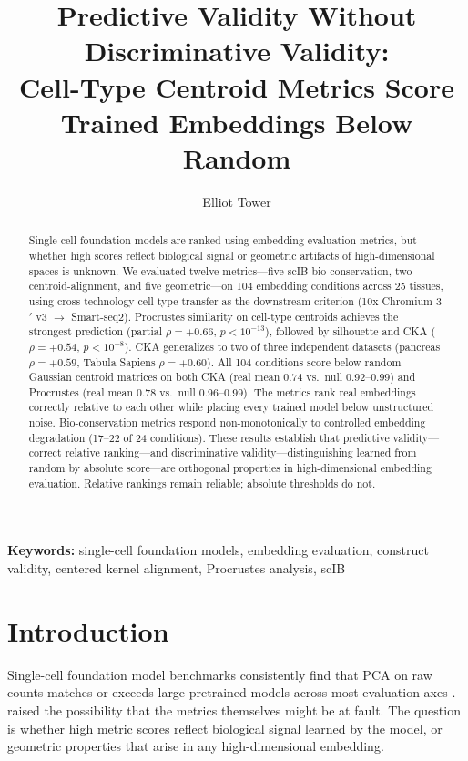 \documentclass[11pt]{article}
\title{Predictive Validity Without Discriminative Validity:\\
Cell-Type Centroid Metrics Score Trained Embeddings Below Random}
\author{Elliot Tower}
\affil{Independent Researcher \\ \texttt{elliot@elliottower.ai}}
\date{}
\begin{document}
\linenumbers
\maketitle

\begin{abstract}
Single-cell foundation models are ranked using embedding evaluation
metrics, but whether high scores reflect biological signal or geometric
artifacts of high-dimensional spaces is unknown. We evaluated twelve
metrics---five scIB bio-conservation, two centroid-alignment, and five
geometric---on 104 embedding conditions across 25 tissues, using
cross-technology cell-type transfer as the downstream criterion (10x
Chromium 3$'$ v3 $\rightarrow$ Smart-seq2). Procrustes similarity on
cell-type centroids achieves the strongest prediction (partial
$\rho = +0.66$, $p < 10^{-13}$), followed by silhouette and CKA
($\rho = +0.54$, $p < 10^{-8}$). CKA generalizes to two of three
independent datasets (pancreas $\rho = +0.59$, Tabula Sapiens
$\rho = +0.60$). All 104 conditions score below random Gaussian
centroid matrices on both CKA (real mean 0.74 vs.\ null 0.92--0.99)
and Procrustes (real mean 0.78 vs.\ null 0.96--0.99). The metrics
rank real embeddings correctly relative to each other while placing
every trained model below unstructured noise. Bio-conservation
metrics respond non-monotonically to controlled embedding degradation
(17--22 of 24 conditions). These results establish that predictive
validity---correct relative ranking---and discriminative
validity---distinguishing learned from random by absolute score---are
orthogonal properties in high-dimensional embedding evaluation.
Relative rankings remain reliable; absolute thresholds do not.
\end{abstract}

\noindent\textbf{Keywords:} single-cell foundation models, embedding evaluation, construct validity, centered kernel alignment, Procrustes analysis, scIB

\section{Introduction}
\label{sec:intro}

Single-cell foundation model benchmarks consistently find that PCA on
raw counts matches or exceeds large pretrained models across most
evaluation axes \citep{wu2025scfm, vcbench2026, unifiedscfm2026,
cellxgeneintegration2026}. \citet{wu2025scfm} raised the possibility
that the metrics themselves might be at fault. The question is whether
high metric scores reflect biological signal learned by the model, or
geometric properties that arise in any high-dimensional embedding.
\end{document}
